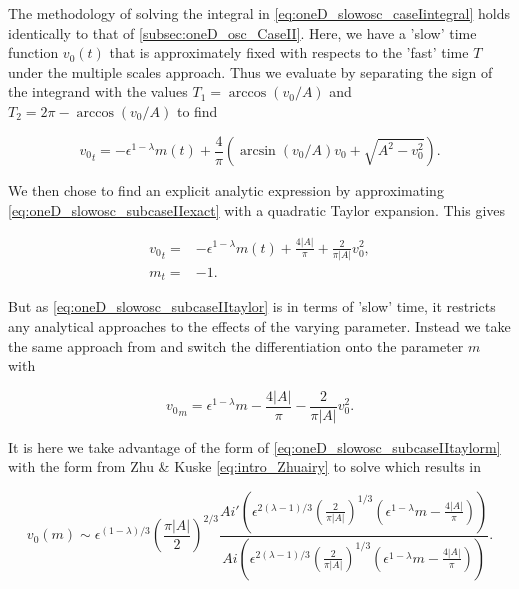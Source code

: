 The methodology of solving the integral in \eqref{eq:oneD_slowosc_caseIintegral} holds identically to that of \autoref{subsec:oneD_osc_CaseII}. Here, we have a 'slow' time function $v_0(t)$ that is approximately fixed with respects to the 'fast' time $T$ under the multiple scales approach. Thus we evaluate by separating the sign of the integrand with the values $T_1=\arccos(v_0/A)$ and $T_2 = 2\pi-\arccos(v_0/A)$ to find

\begin{equation}\label{eq:oneD_slowosc_subcaseIIexact}
{v_0}_t=-\epsilon^{1-\lambda}m(t)+\frac{4}{\pi}\left(\arcsin(v_0/A)v_0+\sqrt{A^2-v_0^2}\right).
\end{equation}

We then chose to find an explicit analytic expression by approximating \eqref{eq:oneD_slowosc_subcaseIIexact} with a quadratic Taylor expansion. This gives

\begin{equation}\label{eq:oneD_slowosc_subcaseIItaylor}
\begin{aligned}
{v_0}_t =& -\epsilon^{1-\lambda}m(t) + \frac{4|A|}{\pi} + \frac{2}{\pi |A|}v_0^2,\\
m_t =& -1.
\end{aligned}
\end{equation}

But as \eqref{eq:oneD_slowosc_subcaseIItaylor} is in terms of 'slow' time, it restricts any analytical approaches to the effects of the varying parameter. Instead we take the same approach from \cite{haberman1979slowly} and switch the differentiation onto the parameter $m$ with

\begin{equation}\label{eq:oneD_slowosc_subcaseIItaylorm}
{v_0}_m = \epsilon^{1-\lambda}m - \frac{4|A|}{\pi} - \frac{2}{\pi |A|}v_0^2.
\end{equation}

It is here we take advantage of the form of \eqref{eq:oneD_slowosc_subcaseIItaylorm} with the form from Zhu \& Kuske \eqref{eq:intro_Zhuairy} to solve which results in

\begin{equation*}
v_0(m)\sim \epsilon^{(1-\lambda)/3}\left( \frac{\pi |A|}{2} \right)^{2/3}\frac{Ai'\left(\epsilon^{2(\lambda-1)/3}\left(\frac{2}{\pi |A|}\right)^{1/3}(\epsilon^{1-\lambda}m-\frac{4|A|}{\pi})\right)}{Ai\left(\epsilon^{2(\lambda-1)/3}\left(\frac{2}{\pi |A|}\right)^{1/3}(\epsilon^{1-\lambda}m-\frac{4|A|}{\pi})\right)}.
\end{equation*}

